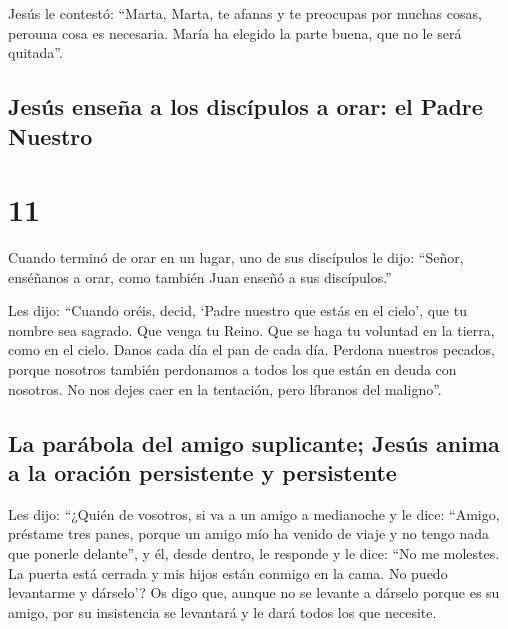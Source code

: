  Jesús le contestó: ``Marta, Marta, te afanas y te
preocupas por muchas cosas,  perouna cosa es necesaria.
María ha elegido la parte buena, que no le será quitada''.

\hypertarget{jesuxfas-enseuxf1a-a-los-discuxedpulos-a-orar-el-padre-nuestro}{%
\subsection{Jesús enseña a los discípulos a orar: el Padre
Nuestro}\label{jesuxfas-enseuxf1a-a-los-discuxedpulos-a-orar-el-padre-nuestro}}

\hypertarget{section-10}{%
\section{11}\label{section-10}}

 Cuando terminó de orar en un lugar, uno de sus discípulos
le dijo: ``Señor, enséñanos a orar, como también Juan enseñó a sus
discípulos.''

 Les dijo: ``Cuando oréis, decid, `Padre nuestro que estás
en el cielo', que tu nombre sea sagrado. Que venga tu Reino. Que se haga
tu voluntad en la tierra, como en el cielo.  Danos cada
día el pan de cada día.  Perdona nuestros pecados, porque
nosotros también perdonamos a todos los que están en deuda con nosotros.
No nos dejes caer en la tentación, pero líbranos del maligno''.

\hypertarget{la-paruxe1bola-del-amigo-suplicante-jesuxfas-anima-a-la-oraciuxf3n-persistente-y-persistente}{%
\subsection{La parábola del amigo suplicante; Jesús anima a la oración
persistente y
persistente}\label{la-paruxe1bola-del-amigo-suplicante-jesuxfas-anima-a-la-oraciuxf3n-persistente-y-persistente}}

 Les dijo: ``¿Quién de vosotros, si va a un amigo a
medianoche y le dice: ``Amigo, préstame tres panes, 
porque un amigo mío ha venido de viaje y no tengo nada que ponerle
delante'',  y él, desde dentro, le responde y le dice:
``No me molestes. La puerta está cerrada y mis hijos están conmigo en la
cama. No puedo levantarme y dárselo'?  Os digo que, aunque
no se levante a dárselo porque es su amigo, por su insistencia se
levantará y le dará todos los que necesite.

